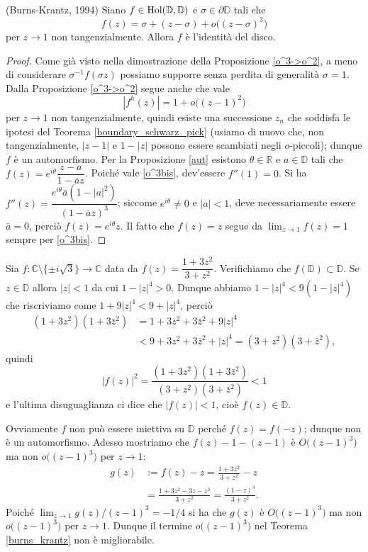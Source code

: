 \begin{thm} \label{burns_krantz}
  (Burns-Krantz, 1994) Siano $f \in \text{\normalfont{Hol}}(\mathbb{D},\mathbb{D})$ e $\sigma \in \partial\mathbb{D}$ tali che
  \begin{equation} \label{o^3bis}
    f(z)=\sigma+(z-\sigma)+o\bigl((z-\sigma)^3\bigr)
  \end{equation}
  per $z \longrightarrow 1$ non tangenzialmente. Allora $f$ è l'identità del disco.
\end{thm}

\begin{proof}
  Come già visto nella dimostrazione della Proposizione \ref{o^3->o^2}, a meno di considerare $\sigma^{-1}f(\sigma z)$ possiamo supporre senza perdita di generalità $\sigma=1$.
  Dalla Proposizione \ref{o^3->o^2} segue anche che vale
  $$|f^h(z)|=1+o\bigl((z-1)^2\bigr)$$
  per $z \longrightarrow 1$ non tangenzialmente, quindi esiste una successione $z_n$ che soddisfa le ipotesi del Teorema \ref{boundary_schwarz_pick} (usiamo di nuovo che, non tangenzialmente, $|z-1|$ e $1-|z|$ possono essere scambiati negli $o$-piccoli); dunque $f$ è un automorfismo.
  Per la Proposizione \ref{aut} esistono $\theta \in \mathbb{R}$ e $a \in \mathbb{D}$ tali che $f(z)=e^{i\theta}\dfrac{z-a}{1-\bar{a}z}$. Poiché vale \eqref{o^3bis}, dev'essere $f''(1)=0$. Si ha $f''(z)=\dfrac{e^{i\theta}\bar{a}(1-|a|^2)}{(1-\bar{a}z)^3}$;
  siccome $e^{i\theta}\not=0$ e $|a|<1$, deve necessariamente essere $\bar{a}=0$, perciò $f(z)=e^{i\theta}z$. Il fatto che $f(z)=z$ segue da $\displaystyle \lim_{z \longrightarrow 1} f(z)=1$ sempre per \eqref{o^3bis}.
\end{proof}

\begin{ex}
  Sia $f:\mathbb{C}\setminus\{\pm i\sqrt{3}\} \longrightarrow \mathbb{C}$ data da $f(z)=\dfrac{1+3z^2}{3+z^2}$. Verifichiamo che $f(\mathbb{D}) \subset \mathbb{D}$. Se $z \in \mathbb{D}$ allora $|z|<1$ da cui $1-|z|^4>0$.
  Dunque abbiamo $1-|z|^4 < 9(1-|z|^4)$ che riscriviamo come $1+9|z|^4 < 9+|z|^4$, perciò
  \begin{align*}
    (1+3z^2)(1+3\bar{z}^2) &=1+3z^2+3\bar{z}^2+9|z|^4 \\
    & < 9+3z^2+3\bar{z}^2+|z|^4=(3+z^2)(3+\bar{z}^2),
  \end{align*}
  quindi
  $$|f(z)|^2=\frac{(1+3z^2)(1+3\bar{z}^2)}{(3+z^2)(3+\bar{z}^2)} < 1$$
  e l'ultima disuguaglianza ci dice che $|f(z)|<1$, cioè $f(z) \in \mathbb{D}$.

  Ovviamente $f$ non può essere iniettiva su $\mathbb{D}$ perché $f(z)=f(-z)$; dunque non è un automorfismo. Adesso mostriamo che $f(z)-1-(z-1)$ è $O\bigl((z-1)^3\bigr)$ ma non $o\bigl((z-1)^3\bigr)$ per $z \longrightarrow 1$:
  \begin{align*}
    g(z) & := f(z)-z=\frac{1+3z^2}{3+z^2}-z \\
    & =\frac{1+3z^2-3z-z^3}{3+z^2}=\frac{(1-z)^3}{3+z^2}.
  \end{align*}
  Poiché $\displaystyle \lim_{z \longrightarrow 1} g(z)/(z-1)^3=-1/4$ si ha che $g(z)$ è $O\bigl((z-1)^3\bigr)$ ma non $o\bigl((z-1)^3\bigr)$ per $z \longrightarrow 1$. Dunque il termine $o\bigl((z-1)^3\bigr)$ nel Teorema \ref{burns_krantz} non è migliorabile.
\end{ex}
